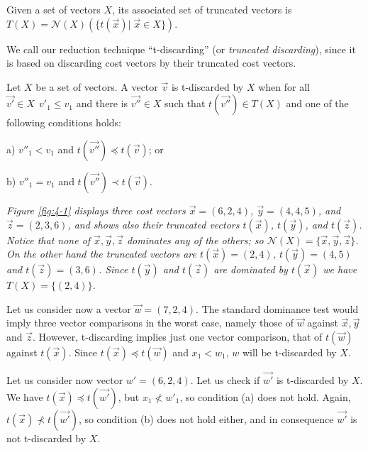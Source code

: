 \begin{defi} \label{chapMultiObjAlg:def:tv2}
Given a  set of vectors  $X$, its associated set of truncated vectors is  
$T(X) = \mathcal{N}(X)(\{ t(\vec x) | \; \vec x \in X\})$. 
\end{defi}

We call our reduction technique ``t-discarding'' (or \textit{truncated discarding}), since it is based on discarding cost vectors by their truncated cost vectors. 

\begin{defi}\label{chapMultiObjAlg:def:tv3}
Let $X$ be a set of vectors. A vector $\vec v$ is t-discarded by $X$ when for all $\vec{v'} \in X \ \ v'_1 \leq v_1$ and there is $\vec{v''}\in X$ such that $t(\vec{v''})\in T(X)$ and one of the following conditions holds:

a) $v''_1 < v_1$ and $t(\vec{v''}) \preceq t(\vec v)$; or

b) $v''_1 = v_1$ and $t(\vec{v''}) \prec t(\vec v)$.
\end{defi} 

\begin{ejemplo}
{\em
Figure \ref{fig:4-1} displays three cost vectors $ \vec x = (6, 2, 4)$, $ \vec y = (4, 4, 5)$, and $ \vec z = (2, 3, 6)$, and shows also their truncated vectors $ {t(\vec x)}$, $ {t(\vec y)}$, and $ {t(\vec z)}$. Notice that none of $\vec x, \vec y, \vec z$ dominates any of the others;
so $\mathcal{N}(X)=\{\vec x,\vec y,\vec z\}$. On the other hand the truncated vectors are $t(\vec x)=(2,4)$, $t(\vec y)=(4,5)$ and $t(\vec z)=(3,6)$. Since ${t(\vec y)}$ and ${t(\vec z)}$ are dominated by ${t(\vec x)}$ we have $T(X)= \{(2,4)\}$. 

Let us consider now  a vector $\vec w=(7,2,4)$. The standard dominance test would imply three vector comparisons in the worst case,
namely those of $\vec w$ against $\vec x, \vec y$ and $\vec z$. However, t-discarding implies just one vector comparison, that of $t(\vec w)$ against $t(\vec x)$.
Since $t(\vec x) \preceq t(\vec w)$ and $x_1 < w_1$, $w$ will be t-discarded by $X$.

Let us consider now vector $w'=(6,2,4)$. Let us check if $\vec{w'}$ is t-discarded by $X$. We have $t(\vec x) \preceq t(\vec{w'})$, but $x_1 \not< w'_1$, so condition (a) does not hold. Again, $t(\vec x) \not\prec t(\vec{w'})$, so condition (b) does not hold either, and in consequence $\vec{w'}$ is not t-discarded by $X$.
}
\end{ejemplo}

